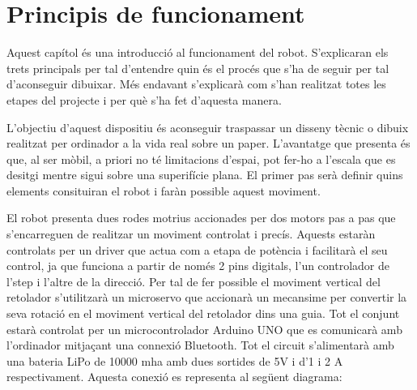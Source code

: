 \setlength\topmargin{8mm}
\onehalfspacing
\chapter{Principis de funcionament} %

\label{Chapter2} %






Aquest capítol és una introducció al funcionament del robot. S'explicaran els trets principals per tal d'entendre quin és el procés que s'ha de seguir per tal d'aconseguir dibuixar. Més endavant s'explicarà com s'han realitzat totes les etapes del projecte i per què s'ha fet d'aquesta manera. 

L'objectiu d'aquest dispositiu és aconseguir traspassar un disseny tècnic o dibuix realitzat per ordinador a la vida real sobre un paper. L'avantatge que presenta és que, al ser mòbil, a priori no té limitacions d'espai, pot fer-ho a l'escala que es desitgi mentre sigui sobre una superifície plana. El primer pas serà definir quins elements consituiran el robot i faràn possible aquest moviment. 

El robot presenta dues rodes motrius accionades per dos motors pas a pas que s'encarreguen de realitzar un moviment controlat i precís. Aquests estaràn controlats per un driver que actua com a etapa de potència i facilitarà el seu control, ja que funciona a partir de només 2 pins digitals, l'un controlador de l'step i l'altre de la direcció. Per tal de fer possible el moviment vertical del retolador s'utilitzarà un microservo que accionarà un mecansime per convertir la seva rotació en el moviment vertical del retolador dins una guia. Tot el conjunt estarà controlat per un microcontrolador Arduino UNO que es comunicarà amb l'ordinador mitjaçant una connexió Bluetooth. Tot el circuit s'alimentarà amb una bateria LiPo de 10000 mha amb dues sortides de 5V i d'1 i 2 A respectivament. Aquesta conexió es representa al següent diagrama:

